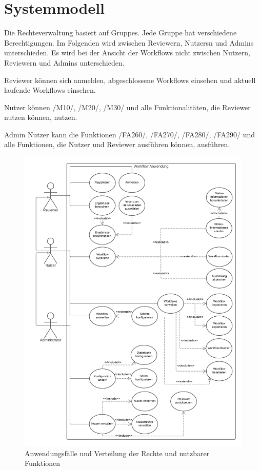 \chapter{Systemmodell}
Die Rechteverwaltung basiert auf \glspl{Gruppe}. Jede Gruppe hat verschiedene Berechtigungen. Im Folgenden wird zwischen \gls{Reviewer}n, \glspl{Nutzer}n und \glspl{Admin} unterschieden. 
Es wird bei der Ansicht der Workflows nicht zwischen \gls{Nutzer}n, \gls{Reviewer}n und \glspl{Admin} unterschieden. 

\gls{Reviewer} können sich anmelden, abgeschlossene Workflows einsehen und aktuell laufende Workflows einsehen.

\gls{Nutzer} können /M10/, /M20/, /M30/ und alle Funktionalitäten, die \gls{Reviewer} nutzen können, nutzen.

\gls{Admin} Nutzer kann die Funktionen /FA260/, /FA270/, /FA280/, /FA290/ und alle Funktionen, die \gls{Nutzer} und \gls{Reviewer} ausführen können, ausführen.


\begin{figure}[ht]
    \centering
    \includegraphics[width = \textwidth]{Grafiken/Diagramme/Anwendungsfalldiagramm.png}
    \caption{Anwendungsfälle und Verteilung der Rechte und nutzbarer Funktionen}
    \label{fig:Abb 1}
\end{figure}